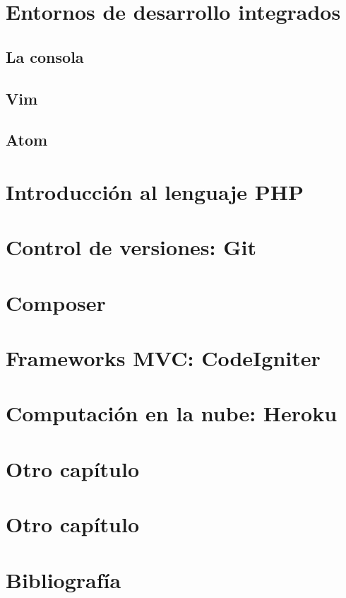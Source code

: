 \documentclass[a4paper,11pt]{memoir}
\begin{document}
\chapter{Entornos de desarrollo integrados}


\section{La consola}


\section{Vim}


\section{Atom}


\chapter{Introducción al lenguaje PHP}


\chapter{Control de versiones: Git}


\chapter{Composer}


\chapter{Frameworks MVC: CodeIgniter}


\chapter{Computación en la nube: Heroku}

\appendix

\chapter{Otro capítulo}
\chapter{Otro capítulo}

\backmatter

\chapter{Bibliografía}
\end{document}
